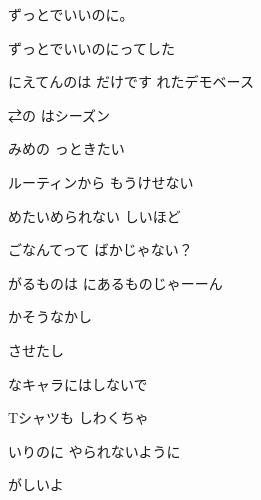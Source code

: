 \documentclass[a4paper,tate,twocolumn,12pt]{ltjtarticle}
\begin{document}
\thispagestyle{empty}

\begin{center}
{\LARGE {}}

{\large ずっとでいいのに。}
\end{center}

\vspace{1em}

\begin{flushleft}

\noindent\begin{minipage}{\linewidth}
ずっとでいいのにってした

にえてんのは だけです れたデモベース

⇄の はシーズン

みめの っときたい
\end{minipage}

\vspace{2em}

\noindent\begin{minipage}{\linewidth}
ルーティンから もうけせない

めたいめられない しいほど

ごなんてって ばかじゃない？

がるものは にあるものじゃーーん
\end{minipage}

\vspace{2em}

\noindent\begin{minipage}{\linewidth}
かそうなかし

させたし

なキャラにはしないで

Tシャツも しわくちゃ

いりのに やられないように

がしいよ 


\end{minipage}
\end{flushleft}
\end{document}
